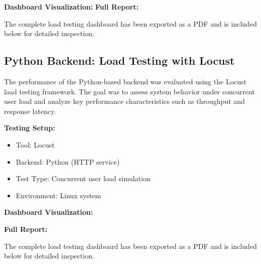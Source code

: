 \documentclass[10pt,a4paper,twocolumn]{article}
\begin{document}
\textbf{Dashboard Visualization:}
\textbf{Full Report:}

The complete load testing dashboard has been exported as a PDF and is included below for detailed inspection.





\subsection{Python Backend: Load Testing with Locust}

The performance of the Python-based backend was evaluated using the Locust load testing framework. The goal was to assess system behavior under concurrent user load and analyze key performance characteristics such as throughput and response latency.

\textbf{Testing Setup:}
\begin{itemize}
    \item Tool: Locust
    \item Backend: Python (HTTP service)
    \item Test Type: Concurrent user load simulation
    \item Environment: Linux system
\end{itemize}

\textbf{Dashboard Visualization:}

\textbf{Full Report:}

The complete load testing dashboard has been exported as a PDF and is included below for detailed inspection.


\end{document}
